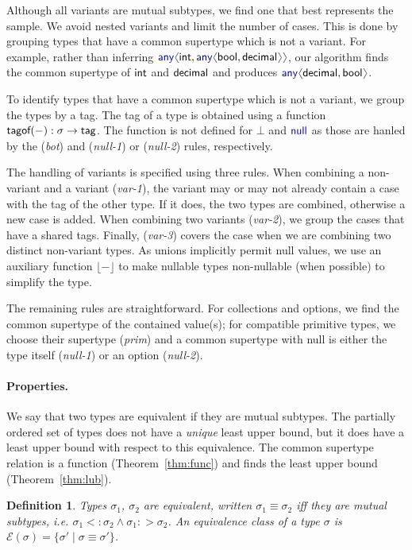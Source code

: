 \documentclass[10pt,preprint,clearpagebib]{sigplanconf}
\newcommand{\langl}{\begin{picture}(4.5,7)
\put(1.1,2.5){\rotatebox{60}{\line(1,0){5.5}}}
\put(1.1,2.5){\rotatebox{300}{\line(1,0){5.5}}}
\end{picture}}
\newcommand{\rangl}{\begin{picture}(4.5,7)
\put(.9,2.5){\rotatebox{120}{\line(1,0){5.5}}}
\put(.9,2.5){\rotatebox{240}{\line(1,0){5.5}}}
\end{picture}}
\newcommand{\kvd}[1]{\textnormal{\textcolor{kvdclr}{\sffamily #1}}}
\newcommand{\ident}[1]{\textnormal{\sffamily #1}}
\newcommand{\tytag}{\ident{tag}}
\newcommand{\dropopt}[1]{\lfloor#1\rfloor}
\newcommand{\tytagof}{\ident{tagof}}
\newtheorem{definition}{Definition}
\begin{document}
Although all variants are mutual subtypes, we find one that best represents the sample. We avoid
nested variants and limit the number of cases. This is done by grouping types 
that have a common supertype which is not a variant. For example, rather than inferring 
$\kvd{any}\langl\ident{int}, \kvd{any}\langl\ident{bool}, \ident{decimal}\rangl\rangl$, 
our algorithm finds the common supertype of $\ident{int}$ and $\ident{decimal}$ and produces 
$\kvd{any}\langl\ident{decimal},\ident{bool}\rangl$.

To identify types that have a common supertype which is not a variant, we group the types by
a tag. The tag of a type is obtained using a function $\tytagof{(-)} : \sigma \rightarrow \tytag$.
The function is not defined for $\bot$ and $\kvd{null}$ as those are hanled by the 
(\emph{bot}) and (\emph{null-1}) or (\emph{null-2}) rules, respectively.

The handling of variants is specified using three rules. When combining a non-variant and a
variant (\emph{var-1}), the variant may or may not already contain a case with the tag of the other
type. If it does, the two types are combined, otherwise a new case is added.
When combining two variants (\emph{var-2}), we group the cases that have a shared tags.
Finally, (\emph{var-3}) covers the case when we are combining two distinct non-variant types.
As unions implicitly permit \kvd{null} values, we use an auxiliary function $\dropopt{-}$ to
make nullable types non-nullable (when possible) to simplify the type.

The remaining rules are straightforward. For collections and options, we find the common supertype 
of the contained value(s); for compatible primitive types, we choose their supertype (\emph{prim})
and a common supertype with \kvd{null} is either the type itself (\emph{null-1}) or an option 
(\emph{null-2}).

\paragraph{Properties.}

We say that two types are equivalent if they are mutual subtypes. The partially ordered set of 
types does not have a \emph{unique} least upper bound, but it does have a least upper bound
with respect to this equivalence. The common supertype relation is a function 
(Theorem~\ref{thm:func}) and finds the least upper bound (Theorem~\ref{thm:lub}). 

\begin{definition}
Types $\sigma_1$, $\sigma_2$ are \emph{equivalent}, written $\sigma_1 \equiv \sigma_2$ iff
they are mutual subtypes, i.e. $\sigma_1 <: \sigma_2 \wedge \sigma_1 :> \sigma_2$.
An equivalence class of a type $\sigma$ is $\mathcal{E}(\sigma) = \{ \sigma' \;|\; \sigma\equiv\sigma' \}$.
\end{definition}
\end{document}
